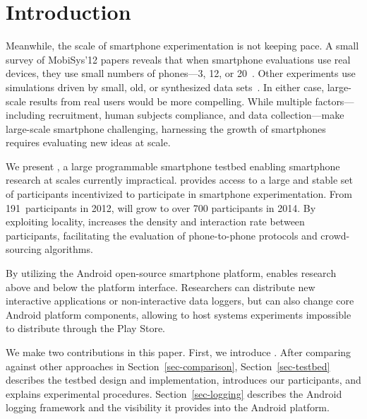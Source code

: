 \section{Introduction}
\label{sec-introduction}


Meanwhile, the scale of smartphone experimentation is not keeping pace. A
small survey of MobiSys'12 papers reveals that when smartphone evaluations
use real devices, they use small numbers of phones---3, 12, or
20~\cite{nowar-mobisys12,comon-mobisys12,caching-mobisys12}. Other
experiments use simulations driven by small, old, or synthesized data
sets~\cite{falcon-mobisys12,ace-mobisys12,humanmobility-mobisys12}. In either
case, large-scale results from real users would be more compelling. While
multiple factors---including recruitment, human subjects compliance, and data
collection---make large-scale smartphone challenging, harnessing the growth
of smartphones requires evaluating new ideas at scale.

\vfill\eject

We present \PhoneLab{}, a large programmable smartphone testbed enabling
smartphone research at scales currently impractical. \PhoneLab{} provides
access to a large and stable set of participants incentivized to participate
in smartphone experimentation. From 191~participants in 2012, \PhoneLab{}
will grow to over 700 participants in 2014. By exploiting locality,
\PhoneLab{} increases the density and interaction rate between participants,
facilitating the evaluation of phone-to-phone protocols and crowd-sourcing
algorithms.

By utilizing the Android open-source smartphone platform, \PhoneLab{} enables
research above and below the platform interface. Researchers can distribute
new interactive applications or non-interactive data loggers, but can also
change core Android platform components, allowing \PhoneLab{} to host systems
experiments impossible to distribute through the Play Store.

We make two contributions in this paper. First, we introduce \PhoneLab{}.
After comparing against other approaches in Section~\ref{sec-comparison},
Section~\ref{sec-testbed} describes the testbed design and implementation,
introduces our participants, and explains experimental procedures.
Section~\ref{sec-logging} describes the Android logging framework and the
visibility it provides into the Android platform.

